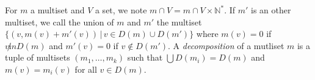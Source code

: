 \documentclass[a4paper]{article}
\DeclareMathOperator{\p}{\mathcal{P}}
\DeclareMathOperator{\m}{\mathcal{M}}
\theoremstyle{definition}
\begin{document}


For $m$ a multiset and $V$ a set, we note $m\cap V = m\cap V\times\mathbb{N}^*$. If $m'$ is an other multiset, we call the union of $m$ and $m'$ the multiset $\{(v,m(v)+m'(v))\,|\, v\in D(m)\cup D(m')\}$ where $m(v) = 0$ if $v\not in D(m)$ and $m'(v) = 0$ if $v\not \in D(m')$.
A \textit{decomposition} of a mutliset $m$ is a tuple of multisets $(m_1,\dots, m_k)$ such that $\bigcup D(m_i) = D(m)$ and $m(v) = m_i(v)$ for all $v\in D(m)$.
\end{document}
